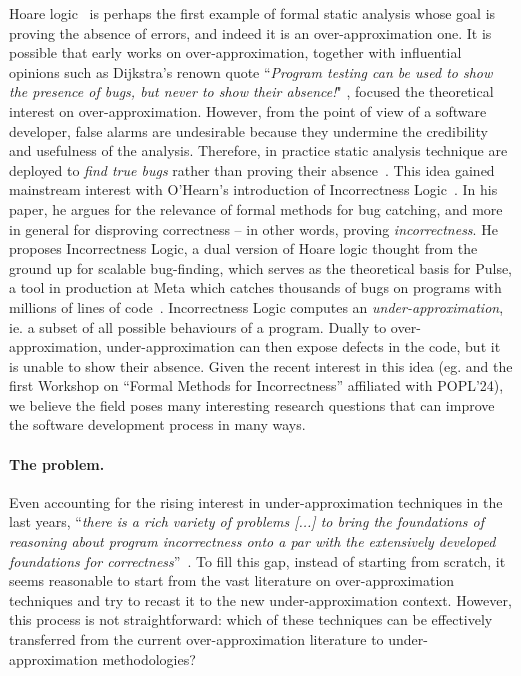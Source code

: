 Hoare logic~\cite{Hoare69} is perhaps the first example of formal static analysis whose goal is proving the absence of errors, and indeed it is an over-approximation one.
It is possible that early works on over-approximation, together with influential opinions such as Dijkstra's renown quote ``\textit{Program testing can be used to show the presence of bugs, but never to show their absence!}" \cite{EWD249}, focused the theoretical interest on over-approximation.
However, from the point of view of a software developer, false alarms are undesirable because they undermine the credibility and usefulness of the analysis. Therefore, in practice static analysis technique are deployed to \emph{find true bugs} rather than proving their absence~\cite{BKY05}.
This idea gained mainstream interest with O'Hearn's introduction of Incorrectness Logic~\cite{OHearn20}. In his paper, he argues for the relevance of formal methods for bug catching, and more in general for disproving correctness -- in other words, proving \emph{incorrectness}. He proposes Incorrectness Logic, a dual version of Hoare logic thought from the ground up for scalable bug-finding, which serves as the theoretical basis for Pulse, a tool in production at Meta which catches thousands of bugs on programs with millions of lines of code~\cite{DFLO19}.
Incorrectness Logic computes an \emph{under-approximation}, ie. a subset of all possible behaviours of a program. Dually to over-approximation, under-approximation can then expose defects in the code, but it is unable to show their absence.
Given the recent interest in this idea (eg. \cite{RBDDOV20,RBDO22,LRVBDO22,CZKON22} and the first Workshop on ``Formal Methods for Incorrectness'' affiliated with POPL'24), we believe the field poses many interesting research questions that can improve the software development process in many ways.

\paragraph*{The problem.}
Even accounting for the rising interest in under-approximation techniques in the last years, ``\textit{there is a rich variety of problems [...] to bring the foundations of reasoning about program incorrectness onto a par with the extensively developed foundations for correctness}''~\cite{OHearn20}. To fill this gap, instead of starting from scratch, it seems reasonable to start from the vast literature on over-approximation techniques and try to recast it to the new under-approximation context. However, this process is not straightforward: which of these techniques can be effectively transferred from the current over-approximation literature to under-approximation methodologies?

